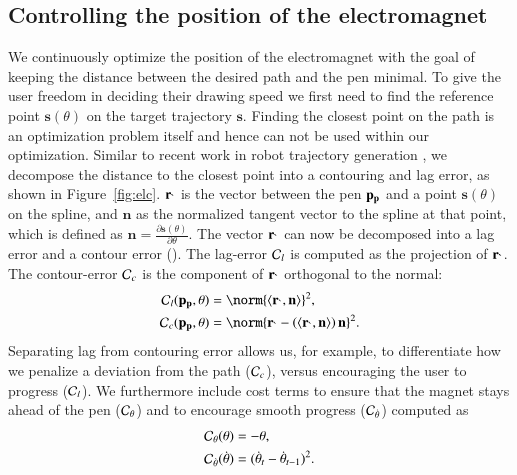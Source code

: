 \subsection{Controlling the position of the electromagnet} 
We continuously optimize the position of the electromagnet with the goal of keeping the distance between the desired path and the pen minimal. 
To give the user freedom in deciding their drawing speed we first need to find the reference point $\mathbf{s}(\theta)$ on the target trajectory $\mathbf{s}$. 
Finding the closest point on the path is an optimization problem itself and hence can not be used within our optimization. 
Similar to recent work in robot trajectory generation \cite{Naegeli:2017:MultiDroneCine, Gebhardt:2018}, we decompose the distance to the closest point into a contouring and lag error, as shown in Figure~\ref{fig:elc}. 
%
$\mathbf{r_{\theta}}$ is the vector between the pen $\mathbf{p_p}$ and a point $\mathbf{s}(\theta)$ on the spline, and $\mathbf{n}$ as the normalized tangent vector to the spline at that point, which is defined as $\mathbf{n} = \frac{\partial \mathbf{s} (\theta)}{\partial\theta}$.
%
The vector $\mathbf{r_{\theta}}$ can now be decomposed into a lag error and a contour error (). 
The lag-error $\mathcal{C}_l$ is computed as the projection of $\mathbf{r_{\theta}}$.
The contour-error $\mathcal{C}_c$ is the component of $\mathbf{r_{\theta}}$ orthogonal to the normal:
%
\begin{equation}
    \begin{aligned}\label{eq:errL_C} 
\Cost_l (\posp, \theta) &= \norm{\langle\Rtheta,\mathbf{n}\rangle}^2 , \\
\Cost_c (\posp, \theta) &= \norm{ \Rtheta - \left( \langle\Rtheta,\mathbf{n}\rangle \right) \mathbf{n} }^2.
\end{aligned}
\end{equation}
%
Separating lag from contouring error allows us, for example, to differentiate how we penalize a deviation from the path ($\mathcal{C}_c$), versus encouraging the user to progress ($\mathcal{C}_l$). %
We furthermore include cost terms to ensure that the magnet stays ahead of the pen ($\mathcal{C}_{\theta}$) and to encourage smooth progress ($\mathcal{C}_{\dot{\theta}}$) computed as
% 
\begin{equation} \label{eq:err_theta}
  \begin{aligned}
\mathcal{C}_{\theta}(\theta) &= - \theta ,\\
\mathcal{C}_{\dot{\theta}}(\dot{\theta}) &= (\dot{\theta}_t-\dot{\theta}_{t-1})^2 .
\end{aligned}  
\end{equation}

